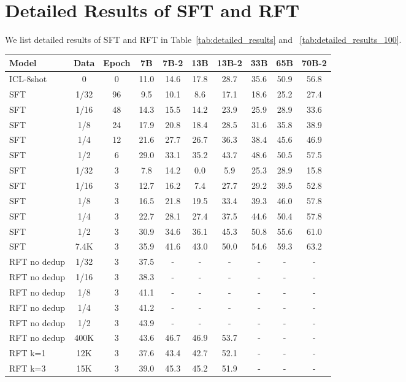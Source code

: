 \documentclass{article} \usepackage{iclr2021_conference,times}
\begin{document}
\section{Detailed Results of SFT and RFT}
We list detailed results of SFT and RFT in Table~\ref{tab:detailed_results} and ~\ref{tab:detailed_results_100}.

\begin{table}[ht]
    \small
    \centering
    \begin{tabular}{l|cc|ccccccc}
  \hline
    Model & Data & Epoch & 7B & 7B-2 & 13B & 13B-2  & 33B & 65B & 70B-2 \\
  \hline
ICL-8shot & 0 & 0 & 11.0 &14.6 &17.8&28.7 & 35.6 & 50.9 & 56.8 \\
  \hline
  SFT & 1/32 & 96 & 9.5 & 10.1 & 8.6 & 17.1& 18.6 & 25.2 & 27.4\\
  SFT & 1/16 & 48 & 14.3 & 15.5 & 14.2 & 23.9 & 25.9 & 28.9 & 33.6\\
  SFT & 1/8 & 24 & 17.9 & 20.8 & 18.4 & 28.5 & 31.6 & 35.8 & 38.9\\
  SFT & 1/4 & 12 & 21.6 & 27.7 & 26.7 & 36.3& 38.4 & 45.6 &46.9\\
  SFT & 1/2 & 6 & 29.0 & 33.1 & 35.2 & 43.7& 48.6 & 50.5 & 57.5 \\
  \hline
  SFT & 1/32 & 3 & 7.8& 14.2 & 0.0 & 5.9 & 25.3 & 28.9 & 15.8\\
  SFT & 1/16 & 3 & 12.7& 16.2 & 7.4 & 27.7 & 29.2& 39.5 & 52.8 \\
  SFT & 1/8 & 3 & 16.5& 21.8 & 19.5 & 33.4 & 39.3& 46.0 & 57.8\\
  SFT & 1/4 & 3 & 22.7& 28.1 & 27.4 & 37.5 & 44.6 & 50.4 & 57.8\\
  SFT & 1/2 & 3 & 30.9& 34.6 & 36.1 & 45.3 & 50.8& 55.6 &61.0 \\
  SFT & 7.4K & 3 & 35.9& 41.6 & 43.0 & 50.0 & 54.6& 59.3 & 63.2 \\
\hline
  RFT no dedup & 1/32 &3 &37.5&-&-&-&-&-&-  \\
  RFT no dedup & 1/16 &3 &38.3&-&-&-&-&-&-  \\
  RFT no dedup & 1/8 &3 &41.1&-&-&-&-&-&-  \\
  RFT no dedup & 1/4 &3 &41.2&-&-&-&-&-&-  \\
  RFT no dedup & 1/2 &3 &43.9&-&-&-&-&-&-  \\
  RFT no dedup & 400K & 3 & 43.6 & 46.7 & 46.9 & 53.7&-&-&- \\
\hline
  RFT k=1 & 12K & 3 & 37.6 & 43.4 & 42.7 & 52.1 &-&-&-\\ 
  RFT k=3 & 15K & 3 & 39.0 & 45.3 & 45.2 & 51.9 &-&-&-\\ 

\end{tabular}
\end{table}
\end{document}
